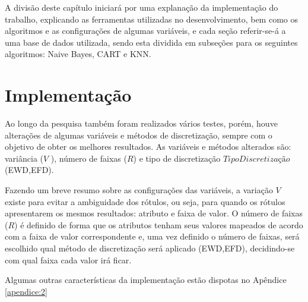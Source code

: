 A divisão deste capítulo iniciará por uma explanação da implementação do trabalho, explicando as ferramentas utilizadas no desenvolvimento, bem como os algoritmos e  as configurações de algumas variáveis, e cada seção referir-se-á a uma base de dados utilizada, sendo esta dividida em subseções para os seguintes algoritmos: Naive Bayes, CART e KNN. 

\section{Implementação}\label{cap:resultados:sec:implement}


Ao longo da pesquisa também foram realizados vários testes, porém, houve alterações de algumas variáveis e métodos de discretização, sempre com o objetivo de obter os melhores resultados. As variáveis e métodos alterados são: variância (${V}$ ), número de faixas (${R}$) e tipo de discretização ${TipoDiscretização}$ (EWD,EFD). 


Fazendo um breve resumo sobre as configurações das variáveis, a variação ${V}$ existe para evitar a ambiguidade dos rótulos, ou seja, para quando os rótulos apresentarem os mesmos resultados: atributo e faixa de valor. O número de faixas (${R}$) é definido de forma que os atributos tenham seus valores mapeados de acordo com a faixa de valor correspondente e, uma vez definido o número de faixas, será escolhido qual método de discretização será aplicado (EWD,EFD), decidindo-se com qual faixa cada valor irá ficar.

Algumas outras características da implementação estão dispotas no Apêndice \ref{apendice:2}




